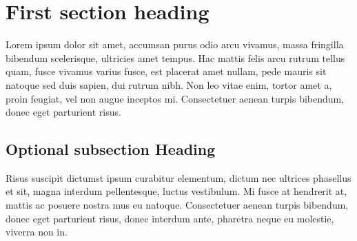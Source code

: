 \section{First section heading}

Lorem ipsum dolor sit amet, accumsan purus odio arcu vivamus,
massa fringilla bibendum scelerisque, ultricies amet tempus.
Hac mattis felis arcu rutrum tellus quam, fusce vivamus varius
fusce, est placerat amet nullam, pede mauris sit natoque sed duis
sapien, dui rutrum nibh. Non leo vitae enim, tortor amet a, proin
feugiat, vel non augue inceptos mi. Consectetuer aenean turpis bibendum, donec eget parturient risus.

\subsection{Optional subsection Heading}

Risus suscipit dictumst ipsum curabitur elementum, dictum nec
ultrices phasellus et sit, magna interdum pellentesque, luctus
vestibulum. Mi fusce at hendrerit at, mattis ac posuere nostra
mus eu natoque. Consectetuer aenean turpis bibendum, donec eget
parturient risus, donec interdum ante, pharetra neque eu molestie,
viverra non in.